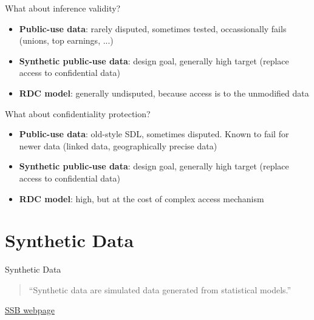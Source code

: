 \begin{frame}{What about inference validity?}
\begin{itemize}
    \item \textbf{Public-use data}: rarely disputed, sometimes tested, occassionally fails (unions, top earnings, ...)
    \item \textbf{Synthetic public-use data}: design goal, generally high target (replace access to confidential data)
    \item \textbf{RDC model}: generally undisputed, because access is to the unmodified data
\end{itemize}
\end{frame}

\begin{frame}{What about confidentiality protection?}
\begin{itemize}
    \item \textbf{Public-use data}: old-style SDL, sometimes disputed. Known to fail for newer data (linked data, geographically precise data)
    \item \textbf{Synthetic public-use data}: design goal, generally high target (replace access to confidential data)
    \item \textbf{RDC model}: high, but at the cost of complex access mechanism
\end{itemize}
\end{frame}

\section{Synthetic Data}

\begin{frame}{Synthetic Data}
\begin{quote}
``Synthetic data are simulated data generated from statistical models.'' 
\end{quote}
{\tiny \href{http://www.census.gov/programs-surveys/sipp/methodology/sipp-synthetic-beta-data-product.html}{SSB webpage} }
\end{frame}


